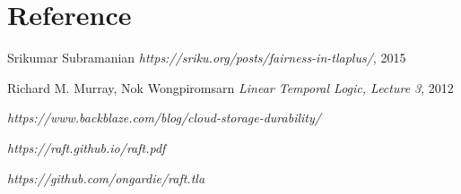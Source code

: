 \documentclass{report}
\begin{document}
\chapter{Reference}

\begin{thebibliography}{9}

\bibitem{}
Srikumar Subramanian
\textit{https://sriku.org/posts/fairness-in-tlaplus/}, 2015

\bibitem{}
Richard M. Murray, Nok Wongpiromsarn
\textit{Linear Temporal Logic, Lecture 3}, 2012

\textit{https://www.backblaze.com/blog/cloud-storage-durability/}

\textit{https://raft.github.io/raft.pdf}

\textit{https://github.com/ongardie/raft.tla}

\end{thebibliography}
\end{document}

